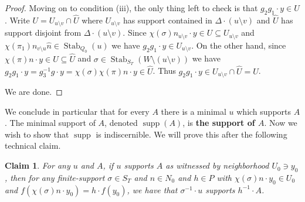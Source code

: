 \documentclass[12pt]{amsart}
\theoremstyle{plain}
\newtheorem{claim}{Claim}
\theoremstyle{definition}
\DeclareMathOperator{\supp}{supp}
\DeclareMathOperator{\Stab}{Stab}
\begin{document}
\begin{proof}
Moving on to condition (iii), the only thing left to check is that $g_2g_1 \cdot y \in U$.
Write $U = U_{u \setminus v} \cap \hat{U}$ where $U_{u \setminus v}$ has support contained in $\Delta \cdot (u \setminus v)$ and $\hat{U}$ has support disjoint from $\Delta \cdot (u \setminus v)$.
Since $\chi(\sigma) n_{u \setminus v} \cdot y \in U \subseteq U_{u \setminus v}$ and $\chi(\pi_1) n_{v \setminus u} \hat{n} \in \Stab_{Q_0}(u)$ we have $g_2g_1 \cdot y \in U_{u \setminus v}$.
On the other hand, since $\chi(\pi) n \cdot y \in U \subseteq \hat{U}$ and $\sigma \in \Stab_{S_T}(W \setminus (u \setminus v))$ we have $g_2g_1 \cdot y =g_3^{-1}g \cdot y =  \chi(\sigma) \chi(\pi) n \cdot y \in \hat{U}$.
Thus $g_2g_1 \cdot y \in U_{u \setminus v} \cap \hat{U} = U$.

We are done.
\end{proof}

We conclude in particular that for every $A$ there is a minimal $u$ which supports $A$.
The minimal support of $A$, denoted $\supp(A)$, is \textbf{the support of $A$}.
Now we wish to show that $\supp$ is indiscernible.
We will prove this after the following technical claim.

\begin{claim}\label{claim:supp_inv}
For any $u$ and $A$, if $u$ supports $A$ as witnessed by neighborhood $U_0 \ni y_0$, then for any finite-support $\sigma \in S_T$ and $n \in N_0$ and $h \in P$ with $\chi(\sigma)n \cdot y_0 \in U_0$ and $f(\chi(\sigma)n \cdot y_0) = h \cdot f(y_0)$, we have that $\sigma^{-1} \cdot u$ supports $h^{-1} \cdot A$.
\end{claim}
\end{document}
